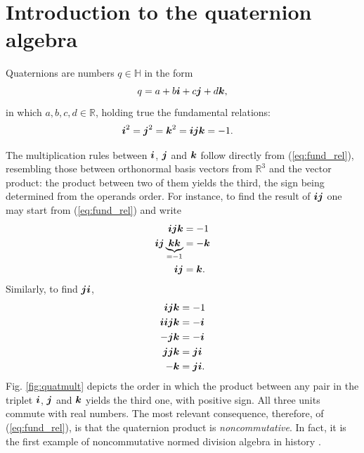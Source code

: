 \section{Introduction to the quaternion algebra}

Quaternions are numbers $q \in \mathbb{H}$ in the form
\begin{equation}
q = a + b\boldsymbol{i} + c\boldsymbol{j} + d\boldsymbol{k},
\label{eq:q}
\end{equation}
in which $a, b, c, d \in \mathbb{R}$, holding true the fundamental relations:
\begin{equation}
\label{eq:fund_rel}
\begin{aligned}
\boldsymbol{i} ^2 = \boldsymbol{j}^2 &=\boldsymbol{k}^2 = \boldsymbol{i} \boldsymbol{j} \boldsymbol{k} = -1.
\end{aligned}
\end{equation}

The multiplication rules between  $ \boldsymbol{i} $, $ \boldsymbol{j} $ and $ \boldsymbol{k} $ follow directly from (\ref{eq:fund_rel}), resembling those between orthonormal basis vectors from $ \mathbb{R}^3 $ and the vector product: the product between two of them yields the third, the sign being determined from the operands order. For instance, to find the result of $ \boldsymbol{i} \boldsymbol{j} $ one may start from (\ref{eq:fund_rel}) and write
\begin{equation}
\begin{aligned}
\boldsymbol{i} \boldsymbol{j} \boldsymbol{k} &= -1 \\
\boldsymbol{i} \boldsymbol{j} \underbrace{\boldsymbol{k} \boldsymbol{k}}_{= -1} &= -\boldsymbol{k} \\
\boldsymbol{i} \boldsymbol{j} &= \boldsymbol{k}.
\end{aligned}
\end{equation}
Similarly, to find $ \boldsymbol{j} \boldsymbol{i} $,
\begin{equation}
\begin{aligned}
\boldsymbol{i} \boldsymbol{j} \boldsymbol{k} &= -1 \\
\boldsymbol{i} \boldsymbol{i} \boldsymbol{j} \boldsymbol{k} &= -\boldsymbol{i} \\
- \boldsymbol{j} \boldsymbol{k} &= - \boldsymbol{i} \\
\boldsymbol{j} \boldsymbol{j} \boldsymbol{k} &=  \boldsymbol{j} \boldsymbol{i} \\
- \boldsymbol{k} &=  \boldsymbol{j} \boldsymbol{i}. \\
\end{aligned}
\end{equation}
Fig. \ref{fig:quatmult} depicts the order in which the product between any pair in the triplet $ \boldsymbol{i} $, $ \boldsymbol{j} $ and $ \boldsymbol{k} $ yields the third one, with positive sign. All three units commute with real numbers. The most relevant consequence, therefore, of (\ref{eq:fund_rel}), is that the quaternion product is \textit{noncommutative}. In fact, it is the first example of noncommutative normed division algebra in history \cite{kleiner2007history}.

